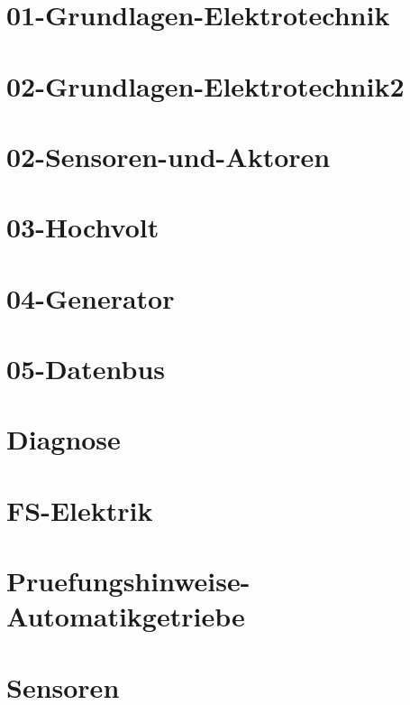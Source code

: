 



\chapter{01-Grundlagen-Elektrotechnik}
%
\chapter{02-Grundlagen-Elektrotechnik2}
%
\chapter{02-Sensoren-und-Aktoren}
%
\chapter{03-Hochvolt}
%
\chapter{04-Generator}
%
\chapter{05-Datenbus}
%
\chapter{Diagnose}
%
\chapter{FS-Elektrik}
%
\chapter{Pruefungshinweise-Automatikgetriebe}
%
\chapter{Sensoren}
%
